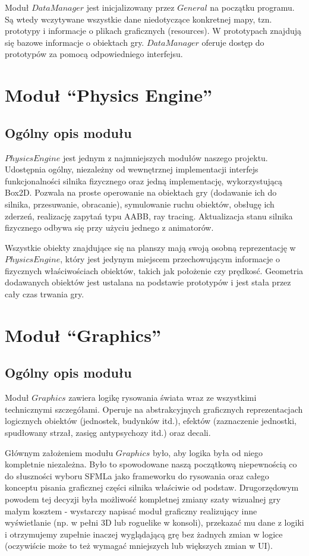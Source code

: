 \documentclass[licencjacka]{pracamgr}
\begin{document}
      Moduł $DataManager$ jest inicjalizowany przez $General$ na początku programu. Są wtedy wczytywane wszystkie dane
      niedotyczące konkretnej mapy, tzn. prototypy i informacje o plikach graficznych (resources). W prototypach
      znajdują się bazowe informacje o obiektach gry. $DataManager$ oferuje dostęp do prototypów za pomocą
      odpowiedniego interfejsu.

  \section{Moduł ``Physics Engine''}
    \subsection{Ogólny opis modułu}
    $PhysicsEngine$ jest jednym z najmniejszych modułów naszego projektu. Udostępnia ogólny, niezależny od 
    wewnętrznej implementacji interfejs funkcjonalności silnika fizycznego oraz jedną implementację, wykorzystującą Box2D.
    Pozwala na proste operowanie na obiektach gry (dodawanie ich do silnika, przesuwanie, obracanie), symulowanie ruchu obiektów,
    obsługę ich zderzeń, realizację zapytań typu AABB, ray tracing. Aktualizacja stanu silnika fizycznego odbywa się przy użyciu jednego
    z animatorów. 
    
    Wszystkie obiekty znajdujące się na planszy mają swoją osobną reprezentację w $PhysicsEngine$, który jest jedynym miejscem
    przechowującym informacje o fizycznych właściwościach obiektów, takich jak położenie czy prędkosć. Geometria dodawanych obiektów
    jest ustalana na podstawie prototypów i jest stała przez cały czas trwania gry. 
  \section{Moduł ``Graphics''}
    \subsection{Ogólny opis modułu}
      Moduł $Graphics$ zawiera logikę rysowania świata wraz ze wszystkimi technicznymi szczegółami. Operuje na
      abstrakcyjnych graficznych reprezentacjach logicznych obiektów (jednostek, budynków itd.), efektów (zaznaczenie
      jednostki, spudłowany strzał, zasięg antypsychozy itd.) oraz decali.

      Głównym założeniem modułu $Graphics$ było, aby logika była od niego kompletnie niezależna. Było to spowodowane
      naszą początkową niepewnością co do słuszności wyboru SFMLa jako frameworku do rysowania oraz całego konceptu
      pisania graficznej części silnika właściwie od podstaw. Drugorzędowym powodem tej decyzji była możliwość
      kompletnej zmiany szaty wizualnej gry małym kosztem - wystarczy napisać moduł graficzny realizujący inne
      wyświetlanie (np. w pełni 3D lub roguelike w konsoli), przekazać mu dane z logiki i otrzymujemy zupełnie inaczej
      wyglądającą grę bez żadnych zmian w logice (oczywiście może to też wymagać mniejszych lub większych zmian w UI).
\end{document}
